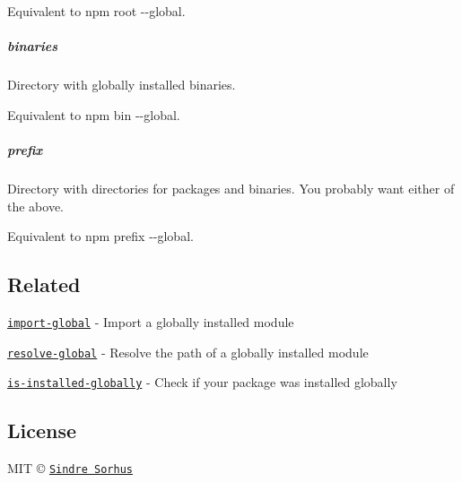 Equivalent to {\ttfamily npm root -\/-\/global}.

\subparagraph*{binaries}

Directory with globally installed binaries.

Equivalent to {\ttfamily npm bin -\/-\/global}.

\subparagraph*{prefix}

Directory with directories for packages and binaries. You probably want either of the above.

Equivalent to {\ttfamily npm prefix -\/-\/global}.

\subsection*{Related}


\begin{DoxyItemize}
\item \href{https://github.com/sindresorhus/import-global}{\tt import-\/global} -\/ Import a globally installed module
\item \href{https://github.com/sindresorhus/resolve-global}{\tt resolve-\/global} -\/ Resolve the path of a globally installed module
\item \href{https://github.com/sindresorhus/is-installed-globally}{\tt is-\/installed-\/globally} -\/ Check if your package was installed globally
\end{DoxyItemize}

\subsection*{License}

M\+IT © \href{https://sindresorhus.com}{\tt Sindre Sorhus} 